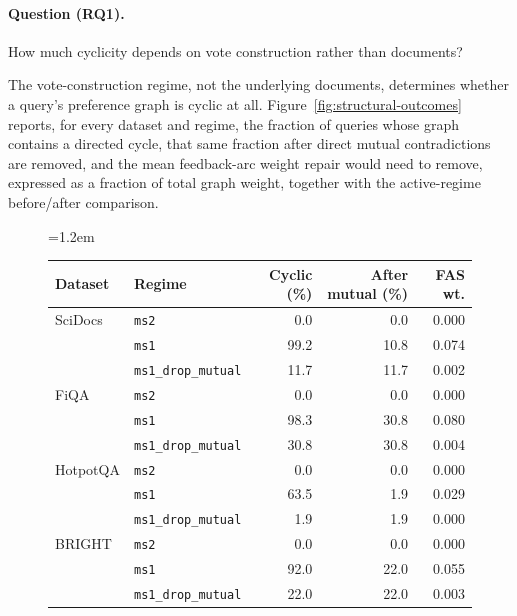 \documentclass[pdflatex,sn-basic,Numbered]{sn-jnl}
\newcommand{\sncstable}{%
  \footnotesize
  \renewcommand{\arraystretch}{1.28}%
  \setlength{\tabcolsep}{3.8pt}%
  \tolerance=2000%
  \emergencystretch=1.2em%
  \hyphenpenalty=200\exhyphenpenalty=200\relax
}
\begin{document}
\paragraph{Question (RQ1).}
How much cyclicity depends on vote construction rather than documents?

The vote-construction regime, not the underlying documents, determines
whether a query's preference graph is cyclic at all.
Figure~\ref{fig:structural-outcomes} reports, for every dataset and regime,
the fraction of queries whose graph contains a directed cycle, that same
fraction after direct mutual contradictions are removed, and the mean
feedback-arc weight repair would need to remove, expressed as a fraction of
total graph weight, together with the active-regime before/after comparison.

\begin{figure}[t]
  \centering
  {\sncstable
  \begin{tabular}{@{}llrrr@{}}
    \toprule
    Dataset & Regime & Cyclic (\%) & After mutual (\%) & FAS wt. \\
    \midrule
    SciDocs  & \texttt{ms2}              &  0.0 &  0.0 & 0.000 \\
             & \texttt{ms1}              & 99.2 & 10.8 & 0.074 \\
             & \texttt{ms1\_drop\_mutual} & 11.7 & 11.7 & 0.002 \\
    \addlinespace
    FiQA     & \texttt{ms2}              &  0.0 &  0.0 & 0.000 \\
             & \texttt{ms1}              & 98.3 & 30.8 & 0.080 \\
             & \texttt{ms1\_drop\_mutual} & 30.8 & 30.8 & 0.004 \\
    \addlinespace
    HotpotQA & \texttt{ms2}              &  0.0 &  0.0 & 0.000 \\
             & \texttt{ms1}              & 63.5 &  1.9 & 0.029 \\
             & \texttt{ms1\_drop\_mutual} &  1.9 &  1.9 & 0.000 \\
    \addlinespace
    BRIGHT   & \texttt{ms2}              &  0.0 &  0.0 & 0.000 \\
             & \texttt{ms1}              & 92.0 & 22.0 & 0.055 \\
             & \texttt{ms1\_drop\_mutual} & 22.0 & 22.0 & 0.003 \\
    \bottomrule
  \end{tabular}}


\end{figure}
\end{document}
